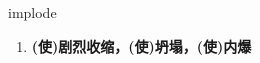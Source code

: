 
\begin{frame}
{\huge implode}
\begin{center}
\begin{enumerate}\Large
  \item \textbf{(使)剧烈收缩，(使)坍塌，(使)内爆}
\end{enumerate}
\end{center}
\end{frame}
